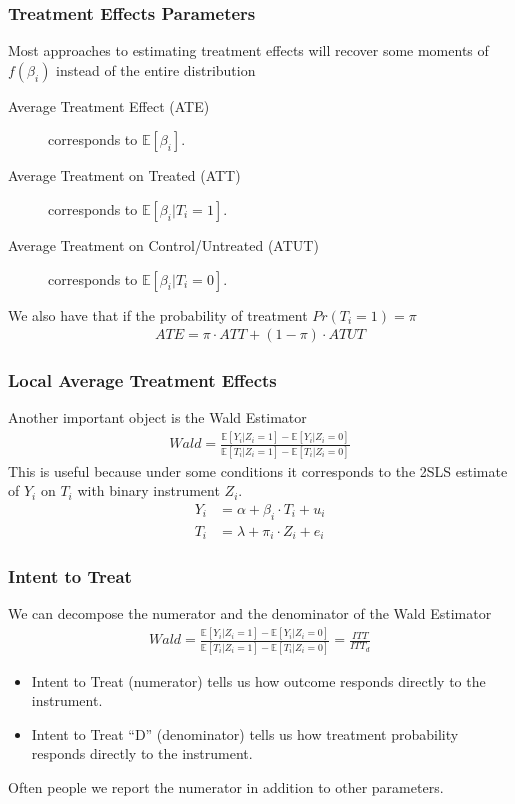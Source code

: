 \documentclass[xcolor=pdftex,dvipsnames,table,mathserif,aspectratio=169]{beamer}
\begin{document}
\begin{frame}
\frametitle{Treatment Effects Parameters}
Most approaches to estimating treatment effects will recover some moments of $f(\beta_i)$ instead of the entire distribution
\begin{description}
\item[Average Treatment Effect (ATE)] corresponds to $\mathbb{E}[\beta_i]$.
\item[Average Treatment on Treated (ATT)] corresponds to $\mathbb{E}[\beta_i | T_i = 1]$.
\item[Average Treatment on Control/Untreated (ATUT)] corresponds to $\mathbb{E}[\beta_i | T_i = 0]$.
\end{description}
We also have that if the probability of treatment $ Pr(T_i=1) = \pi$
\begin{align*}
ATE = \pi \cdot ATT + (1-\pi) \cdot ATUT
\end{align*}
\end{frame}

\begin{frame}
\frametitle{Local Average Treatment Effects}
Another important object is the \alert{Wald Estimator}
\begin{align*}
Wald = \frac{\mathbb{E}[Y_i | Z_i =1] - \mathbb{E}[Y_i | Z_i =0]}{\mathbb{E}[T_i  | Z_i =1] - \mathbb{E}[T_i | Z_i =0]} 
\end{align*}
This is useful because under some conditions it corresponds to the 2SLS estimate of $Y_i$ on $T_i$ with binary instrument $Z_i$.
\begin{align*}
Y_i &= \alpha + \beta_i \cdot T_i + u_i \\
T_i &= \lambda + \pi_i \cdot Z_i + e_i
\end{align*}
\end{frame}


\begin{frame}
\frametitle{Intent to Treat}
We can decompose the numerator and the denominator of the \alert{Wald Estimator}
\begin{align*}
Wald = \frac{\mathbb{E}[Y_i | Z_i =1] - \mathbb{E}[Y_i | Z_i =0]}{\mathbb{E}[T_i  | Z_i =1] - \mathbb{E}[T_i | Z_i =0]}  = \frac{ITT}{ITT_d}
\end{align*}
\begin{itemize}
\item \alert{Intent to Treat} (numerator) tells us how outcome responds directly to the instrument.
\item \alert{Intent to Treat ``D''} (denominator) tells us how treatment probability responds directly to the instrument.
\end{itemize}
Often people we report the numerator in addition to other parameters.
\end{frame}
\end{document}
